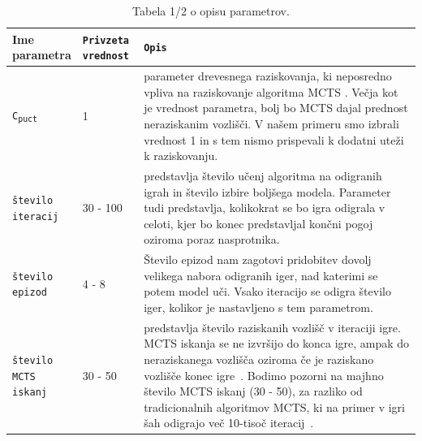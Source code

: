 \documentclass[a4paper, 12pt]{book}
\begin{document}
\begin{table}
	\begin{center}
		\begin{tabular}{p{0.15\linewidth}|p{0.15\linewidth}|p{0.7\linewidth}}
			Ime parametra                             & {\tt Privzeta vrednost} & {\tt Opis} \\ \hline
			{\tt C\textsubscript{puct}}               & 1 						& parameter drevesnega raziskovanja, ki neposredno vpliva na raziskovanje algoritma MCTS . 
																				  Večja kot je vrednost parametra, bolj bo MCTS dajal prednost neraziskanim vozlišči. 
																				  V našem primeru smo izbrali vrednost 1 in s tem nismo prispevali k dodatni uteži k raziskovanju.\\
			{\tt število iteracij}                    & 30 - 100					& predstavlja število učenj algoritma na odigranih igrah in število izbire boljšega modela.
																				  Parameter tudi predstavlja, kolikokrat se bo igra odigrala v celoti, kjer bo konec predstavljal končni pogoj oziroma poraz nasprotnika.\\
			{\tt število epizod}                      & 4 - 8 						& Število epizod nam zagotovi pridobitev dovolj velikega nabora odigranih iger, nad katerimi se potem model uči.
																				  Vsako iteracijo se odigra število iger, kolikor je nastavljeno s tem parametrom.\\
			{\tt število MCTS iskanj}                 & 30 - 50					& predstavlja število raziskanih vozlišč v iteraciji igre. 
														 						  MCTS iskanja se ne izvršijo do konca igre, ampak do neraziskanega vozlišča oziroma če je raziskano vozlišče konec igre~\cite{silver2018general}.
														 						  Bodimo pozorni na majhno število MCTS iskanj (30 - 50), za razliko od tradicionalnih algoritmov MCTS, ki na primer v igri šah odigrajo več 10-tisoč iteracij~\cite{kohne}.\\
		
		\end{tabular}
	\end{center}
	\caption{Tabela 1/2 o opisu parametrov.}
	\label{tableParameters1}
\end{table}
\end{document}
